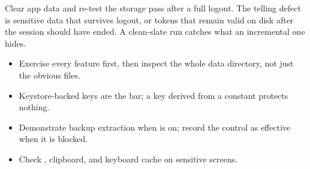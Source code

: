 \begin{trap}
Clear app data and re-test the storage pass after a full logout. The telling defect is sensitive data that survives logout, or tokens that remain valid on disk after the session should have ended. A clean-slate run catches what an incremental one hides.
\end{trap}

\begin{summarybox}
\begin{itemize}
\item Exercise every feature first, then inspect the whole data directory, not just the obvious files.
\item Keystore-backed keys are the bar; a key derived from a constant protects nothing.
\item Demonstrate backup extraction when  is on; record the control as effective when it is blocked.
\item Check , clipboard, and keyboard cache on sensitive screens.
\end{itemize}
\end{summarybox}
